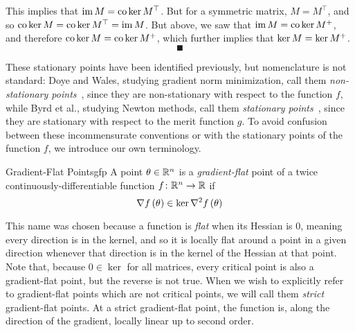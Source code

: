 \documentclass[../../thesis.tex]{subfiles}
\begin{document}
\begin{center}
\end{center}

This implies that $\operatorname*{im} M = \operatorname*{co}\ker M^\top$.
But for a symmetric matrix,
$M = M^\top$,
and so $\operatorname*{co}\ker M = \operatorname*{co}\ker M^\top = \operatorname*{im} M$.
But above, we saw that $\operatorname*{im} M = \operatorname*{co}\ker M^{+}$,
and therefore $\operatorname*{co}\ker M = \operatorname*{co}\ker M^{+}$,
which further implies that $\ker M = \ker M^{+}$.
\[\QED\]

These stationary points have been identified previously,
but nomenclature is not standard:
Doye and Wales, studying gradient norm minimization,
call them \emph{non-stationary points}~\cite{doye2002},
since they are non-stationary with respect to the function $f$,
while Byrd et al., studying Newton methods,
call them \emph{stationary points}~\cite{byrd2004},
since they are stationary with respect to the merit function $g$.
To avoid confusion between these incommensurate conventions
or with the stationary points of the function $f$,
we introduce our own terminology.

\begin{definition}{Gradient-Flat Points}{gfp}
	A point $\theta\in\mathbb{R}^n$ is a \emph{gradient-flat} point
	of a twice continuously-differentiable function
	$f\colon\mathbb{R}^n\to\mathbb{R}$ if
	\begin{equation}
		\nabla f\left(\theta\right) \in \ker \nabla^2f\left(\theta\right)
	\end{equation}
\end{definition}

This name was chosen because a function is \emph{flat}
when its Hessian is 0, meaning every direction is in the kernel,
and so it is locally flat around a point in a given direction
whenever that direction is in the kernel of the Hessian at that point.
Note that, because $0 \in \ker$ for all matrices,
every critical point is also a gradient-flat point,
but the reverse is not true.
When we wish to explicitly refer to gradient-flat points
which are not critical points,
we will call them \emph{strict} gradient-flat points.
At a strict gradient-flat point, the function is,
along the direction of the gradient,
locally linear up to second order.
\end{document}
